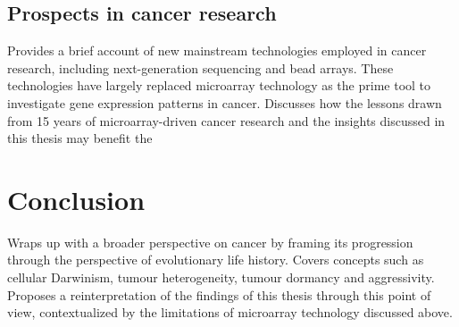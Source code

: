 \documentclass[11pt]{article}
\begin{document}
\subsection{Prospects in cancer research}
\label{sec-5-4}
Provides a brief account of new mainstream technologies employed in cancer
research, including next-generation sequencing and bead arrays. These
technologies have largely replaced microarray technology as the prime tool to
investigate gene expression patterns in cancer. Discusses how the lessons drawn
from 15 years of microarray-driven cancer research and the insights discussed in
this thesis may benefit the
\section{Conclusion}
\label{sec-6}
Wraps up with a broader perspective on cancer by framing its progression through
the perspective of evolutionary life history. Covers concepts such as cellular
Darwinism, tumour heterogeneity, tumour dormancy and aggressivity. Proposes a
reinterpretation of the findings of this thesis through this point of view,
contextualized by the limitations of microarray technology discussed above.
\end{document}
